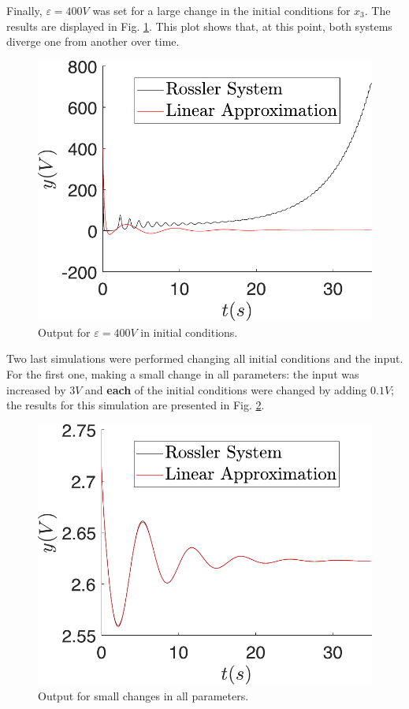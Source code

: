 Finally, $\varepsilon=400V$ was set for a large change in the initial conditions for $x_3$. The results are displayed in Fig. \ref{fig:ci_x3_400}. This plot shows that, at this point, both systems diverge one from another over time.
\begin{figure}[H]
    \centering
    \includegraphics[scale=0.5]{figs/comparLinearVSNonlinear/Lejos_lineal_nl_400.pdf}
    \caption{Output for $\varepsilon=400V$ in initial conditions.}
    \label{fig:ci_x3_400}
\end{figure}

Two last simulations were performed changing all initial conditions and the input. For the first one, making a small change in all parameters: the input was increased by $3V$ and \textbf{each} of the initial conditions were changed by adding $0.1V$; the results for this simulation are presented in Fig. \ref{fig:Delta_all_small}. 
\begin{figure}
    \centering
    \includegraphics[scale=0.55]{figs/comparLinearVSNonlinear/Cerca_todos_lineal_nl_u3_ci01.pdf}
    \caption{Output for small changes in all parameters.}
    \label{fig:Delta_all_small}
\end{figure}


